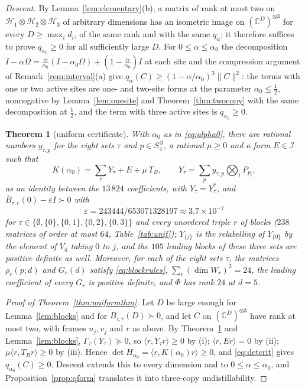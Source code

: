 \documentclass[aps,pra,twocolumn,superscriptaddress,nofootinbib,longbibliography]{revtex4-2}
\newcommand{\C}{\mathbb C}
\newcommand{\Hh}{\mathcal H}
\newcommand{\ip}[2]{\langle #1,#2\rangle}
\newcommand{\Om}{\Omega}
\theoremstyle{plain}
\newtheorem{theorem}{Theorem}[section]
\theoremstyle{definition}
\theoremstyle{remark}
\begin{document}
\emph{Descent.} By Lemma~\ref{lem:elementary}(b), a matrix of rank at most two on $\Hh_1\otimes\Hh_2\otimes\Hh_3$ of arbitrary dimensions has an isometric image on $(\C^D)^{\otimes3}$ for every $D\ge\max_id_i$, of the same rank and with the same $q_\alpha$; it therefore suffices to prove $q_{\alpha_0}\ge0$ for all sufficiently large $D$. For $0\le\alpha\le\alpha_0$ the decomposition $I-\alpha\Om=\tfrac{\alpha}{\alpha_0}(I-\alpha_0\Om)+(1-\tfrac{\alpha}{\alpha_0})I$ at each site and the compression argument of Remark~\ref{rem:interval}(a) give $q_\alpha(C)\ge(1-\alpha/\alpha_0)^3\|C\|^2$: the terms with one or two active sites are one- and two-site forms at the parameter $\alpha_0\le\tfrac12$, nonnegative by Lemma~\ref{lem:onesite} and Theorem~\ref{thm:twocopy} with the same decomposition at $\tfrac12$, and the term with three active sites is $q_{\alpha_0}\ge0$.

\begin{theorem}[uniform certificate]\label{thm:unif}
With $\alpha_0$ as in \eqref{eq:alpha0}, there are rational numbers $y_{\tau,p}$ for the eight sets $\tau$ and $p\in S_4^{\,3}$, a rational $\mu\ge0$ and a form $E\in\mathcal I$ such that
\begin{equation}\label{eq:unifid}
K(\alpha_0)=\sum_\tau Y_\tau+E+\mu\,T_B,\qquad Y_\tau=\sum_py_{\tau,p}\bigotimes_iP_{p_i},
\end{equation}
as an identity between the $13\,824$ coefficients, with $Y_\tau=Y_\tau^*$, and $\bar B_{\tau,r}(0)-\varepsilon I\succ0$ with
\[\varepsilon=243444/653071328197\approx3.7\times10^{-7}\]
for $\tau\in\{\emptyset,\{0\},\{0,1\},\{0,2\},\{0,3\}\}$ and every unordered triple $r$ of blocks ($238$ matrices of order at most $64$, Table~\ref{tab:unif}); $Y_{\{j\}}$ is the relabelling of $Y_{\{0\}}$ by the element of $V_4$ taking $0$ to $j$, and the $105$ leading blocks of these three sets are positive definite as well. Moreover, for each of the eight sets $\tau$, the matrices $\rho_r(p;d)$ and $G_r(d)$ satisfy \eqref{eq:blockrules}, $\sum_r(\dim W_r)^2=24$, the leading coefficient of every $G_r$ is positive definite, and $\Phi$ has rank $24$ at $d=5$.
\end{theorem}

\begin{proof}[Proof of Theorem~\ref{thm:uniformthm}]
Let $D$ be large enough for Lem\-ma~\ref{lem:blocks} and for $B_{\tau,r}(D)\succ0$, and let $C$ on $(\C^D)^{\otimes3}$ have rank at most two, with frames $u_j,v_j$ and $r$ as above. By Theorem~\ref{thm:unif} and Lemma~\ref{lem:blocks}, $\Gamma_\tau(Y_\tau)\succeq0$, so $\ip r{Y_\tau r}\ge0$ by (i); $\ip r{Er}=0$ by (ii); $\mu\ip r{T_Br}\ge0$ by (iii). Hence $\det H_{\alpha_0}=\ip r{K(\alpha_0)r}\ge0$, and \eqref{eq:detcrit} gives \mbox{$q_{\alpha_0}(C)\ge0$}. Descent extends this to every dimension and to \mbox{$0\le\alpha\le\alpha_0$}, and Proposition~\ref{prop:qform} translates it into three-copy undistillability.
\end{proof}
\end{document}
